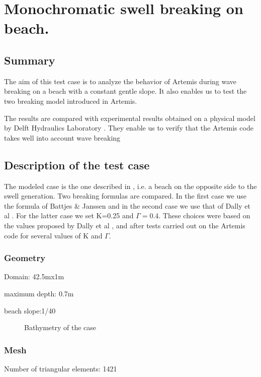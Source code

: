 \chapter{Monochromatic swell breaking on beach.}

\section{Summary}

The aim of this test case is to analyze the behavior of Artemis during wave
breaking on a beach with a constant gentle slope. It also enables us to test
the two breaking model introduced in Artemis.

The results are compared with experimental results obtained on a physical model
by Delft Hydraulics Laboratory \cite{Stive1984}. They enable us to verify that
the Artemis code takes well into account wave breaking

\section{Description of the test case}
The modeled case is the one described in \cite{Stive1984}, i.e. a beach on the
opposite side to the swell generation. Two breaking formulas are compared. In
the first case we use the formula of Battjes \& Janssen \cite{Battjes1978} and
in the second case we use that of Dally et al \cite{Dally1984}. For the latter
case we set K=0.25 and $\Gamma=0.4$. These choices were based on the values
proposed by Dally et al \cite{Dally1984}, and after tests carried out on the
Artemis code for several values of K and $\Gamma$.

\subsection{Geometry}

Domain: 42.5mx1m

maximum depth: 0.7m

beach slope:1/40

\begin{figure}[h]
\begin{center}
\end{center}
\caption{Bathymetry of the case}
\label{fig:breaking_Bathy}
\end{figure}

\subsection{Mesh}
Number of triangular elements: 1421

